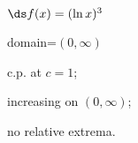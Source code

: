 {$\ds f(x) =(\ln x)^3$
}
{domain=$(0,\infty)$

c.p. at $c=1$; 

increasing on $(0,\infty)$;

no relative extrema.
}
